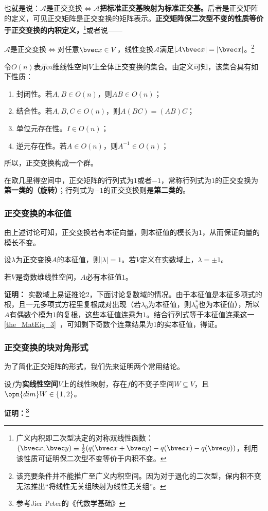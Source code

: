 也就是说：$\mathcal A$是正交变换$\Longleftrightarrow \mathcal A$\textbf{把标准正交基映射为标准正交基。}后者是正交矩阵的定义，可见正交矩阵是正交变换的矩阵表示。\textbf{正交矩阵保二次型不变的性质等价于正交变换的内积定义，}\footnote{广义内积即二次型决定的对称双线性函数：$(\bvec x,\bvec y)\equiv \frac{1}{2}(q(\bvec x+\bvec y)-q(\bvec x)-q(\bvec y))$，利用该性质可证明保二次型不变等价于内积不变。}或者说——

$\mathcal A$是正交变换$\Longleftrightarrow $对任意$\bvec x\in V$，线性变换$\mathcal A$满足$|\mathcal A\bvec x|=|\bvec x|$。\footnote{该充要条件并不能推广至广义内积空间。因为对于退化的二次型，保内积不变无法推出“将线性无关组映射为线性无关组”。}

令$O(n)$表示$n$维线性空间$V$上全体正交变换的集合。由定义可知，该集合具有如下性质：
\begin{enumerate}
\item 封闭性。若$A,B\in O(n)$，则$AB\in O(n)$；
\item 结合性。若$A,B,C\in O(n)$，则$A(BC)=(AB)C$；
\item 单位元存在性。$I\in O(n)$；
\item 逆元存在性。若$A\in O(n)$，则$A^{-1}\in O(n)$；
\end{enumerate}
所以，正交变换构成一个群。

在欧几里得空间中，正交矩阵的行列式为$1$或者$-1$，常称行列式为$1$的正交变换为\textbf{第一类的（旋转）}；行列式为$-1$的正交变换则是\textbf{第二类的}。
\subsubsection{正交变换的本征值}
由上述讨论可知，正交变换若有本征向量，则本征值的模长为$1$，从而保证向量的模长不变。
\begin{corollary}{}
 设$\lambda$为正交变换$A$的本征值，则$|\lambda|=1$。若$V$定义在实数域上，$\lambda=\pm 1$。
\end{corollary}
\begin{corollary}{}
若$V$是奇数维线性空间，$A$必有本征值$1$。
\end{corollary}
\textbf{证明：}
实数域上易证推论2，下面讨论复数域的情况。由于本征值是本征多项式的根，且一元多项式方程里复根成对出现（若$\lambda_0$为本征值，则$\lambda_0^{*}$也为本征值），所以$A$有偶数个模为$1$的复根，这些本征值连乘为$1$。结合行列式等于本征值连乘这一\autoref{the_MatEig_3}~，可知剩下奇数个连乘结果为1的实本征值，得证。
\subsubsection{正交变换的块对角形式}
为了简化正交矩阵的形式，我们先来证明两个常用结论。
\begin{lemma}{}\label{lem_ortho_1}
设$f$为\textbf{实线性空间}$V$上的线性映射，存在$f$的不变子空间$W\subseteq V$，且$\opn{dim}W\in\{1,2\}$。
\end{lemma}
\textbf{证明：\footnote{参考Jier Peter的《代数学基础》}}

